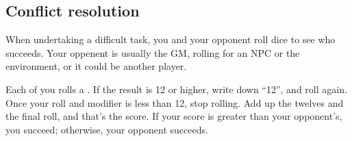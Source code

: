 
\subsection{Conflict resolution}
When undertaking a difficult task, you and your opponent roll dice to see who succeeds. Your oppenent is usually the GM, rolling for an NPC or the environment, or it could be another player.

Each of you rolls a . If the result is 12 or higher, write down ``12'', and roll again. Once your roll and modifier is less than 12, stop rolling. Add up the twelves and the final roll, and that's the score. If your score is greater than your opponent's, you succeed; otherwise, your opponent succeeds.
